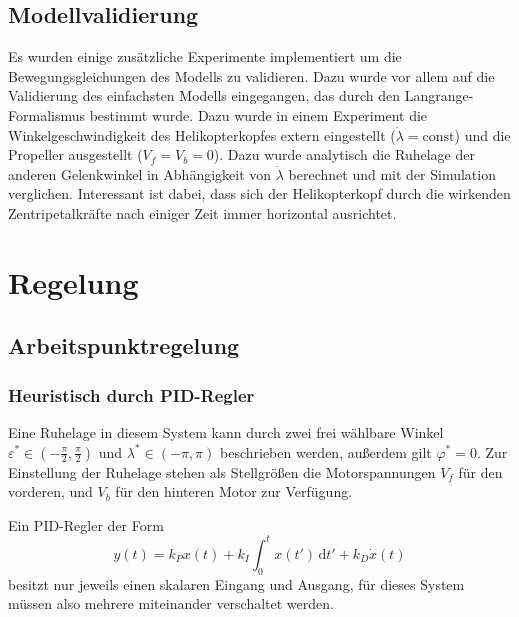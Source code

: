 \documentclass[times, 9pt,twocolumn]{article}
\begin{document}
	\subsection{Modellvalidierung}

	Es wurden einige zusätzliche Experimente implementiert um die Bewegungsgleichungen des Modells zu validieren. Dazu wurde vor allem auf die Validierung des einfachsten Modells eingegangen, das durch den Langrange-Formalismus bestimmt wurde.
	Dazu wurde in einem Experiment die Winkelgeschwindigkeit des Helikopterkopfes extern eingestellt ($\dot{\lambda} = \mathrm{const}$) und die Propeller ausgestellt ($V_f = V_b = 0$).
	Dazu wurde analytisch die Ruhelage der anderen Gelenkwinkel in Abhängigkeit von $\dot{\lambda}$ berechnet und mit der Simulation verglichen.
	Interessant ist dabei, dass sich der Helikopterkopf durch die wirkenden Zentripetalkräfte nach einiger Zeit immer horizontal ausrichtet.
	
	\section{Regelung}
	\subsection{Arbeitspunktregelung}
	\subsubsection{Heuristisch durch PID-Regler}
	Eine Ruhelage in diesem System kann durch zwei frei wählbare Winkel \(\varepsilon^* \in (-\frac{\pi}{2}, \frac{\pi}{2})\) und \(\lambda^* \in (-\pi, \pi)\) beschrieben werden, außerdem gilt \(\varphi^*=0\).
	Zur Einstellung der Ruhelage stehen als Stellgrößen die Motorspannungen \(V_f\) für den vorderen, und \(V_b\) für den hinteren Motor zur Verfügung.

	Ein PID-Regler der Form
	\[
		y(t) = k_P x(t) + k_I \int_0^t x(t') \, \mathrm{d}t' +  k_D \dot{x}(t)
	\]
	besitzt nur jeweils einen skalaren Eingang und Ausgang, für dieses System müssen also mehrere miteinander verschaltet werden.
	
\end{document}
